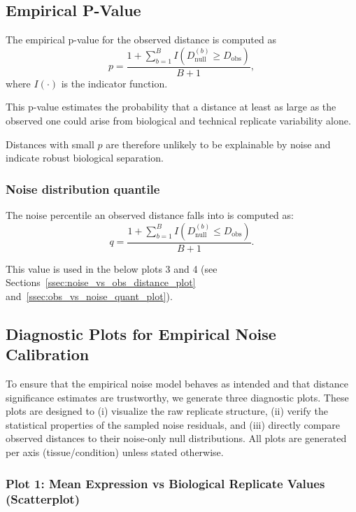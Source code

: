     \subsection{Empirical P-Value}

        The empirical p-value for the observed distance is computed as
        \[
            p = \frac{1 + \sum_{b=1}^{B} I\!\left(D_{\mathrm{null}}^{(b)} \ge D_{\mathrm{obs}}\right)}{B + 1},
        \]
        where $I(\cdot)$ is the indicator function.

        This p-value estimates the probability that a distance at least as large as the observed one could arise from biological and technical replicate variability alone.

        Distances with small $p$ are therefore unlikely to be explainable by noise and indicate robust biological separation.

        \subsubsection{Noise distribution quantile}

            The noise percentile an observed distance falls into is computed as:
            \[
                q = \frac{1 + \sum_{b=1}^{B} I\!\left(D_{\mathrm{null}}^{(b)} \le D_{\mathrm{obs}}\right)}{B + 1}.
            \]

            This value is used in the below plots 3 and 4 (see Sections~\ref{ssec:noise_vs_obs_distance_plot} and~\ref{ssec:obs_vs_noise_quant_plot}).

    \subsection{Diagnostic Plots for Empirical Noise Calibration}

        To ensure that the empirical noise model behaves as intended and that distance significance estimates are trustworthy, we generate three diagnostic plots. These plots are designed to (i) visualize the raw replicate structure, (ii) verify the statistical properties of the sampled noise residuals, and (iii) directly compare observed distances to their noise-only null distributions. All plots are generated per axis (tissue/condition) unless stated otherwise.

        \subsubsection{Plot 1: Mean Expression vs Biological Replicate Values (Scatterplot)}

